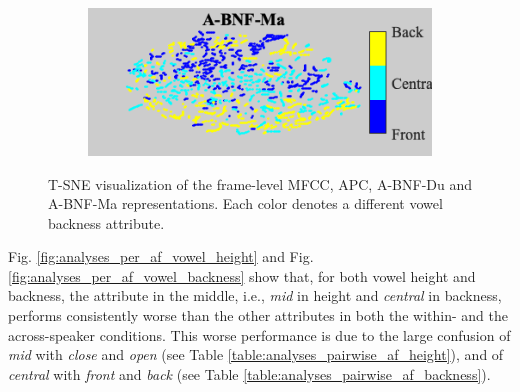 \documentclass[transmag]{IEEEtran}
\begin{document}
\begin{figure}[!t]
\begin{subfigure}{0.495\linewidth}
	   \centering
	   \includegraphics[width=1\linewidth]{Rtsne_af_backness_bnf_aidatatang_apc_input_disc_bar_adjust_journal.png}
    \end{subfigure}
    \caption{T-SNE visualization of the frame-level  MFCC, APC, A-BNF-Du and A-BNF-Ma representations. Each color denotes a different vowel backness attribute.}
        \label{fig:analysis_tsne_vowel_backness}

\end{figure}
Fig. \ref{fig:analyses_per_af_vowel_height} and Fig. \ref{fig:analyses_per_af_vowel_backness} show that, for both vowel height and backness, the attribute in the middle, i.e., \textit{mid} in height and \textit{central} in backness, performs consistently worse than the other attributes in both the within- and the across-speaker conditions. This worse performance is due to the  large confusion of \textit{mid} with \textit{close} and \textit{open} (see Table \ref{table:analyses_pairwise_af_height}), and of \textit{central} with \textit{front} and \textit{back} (see Table \ref{table:analyses_pairwise_af_backness}).
\end{document}
